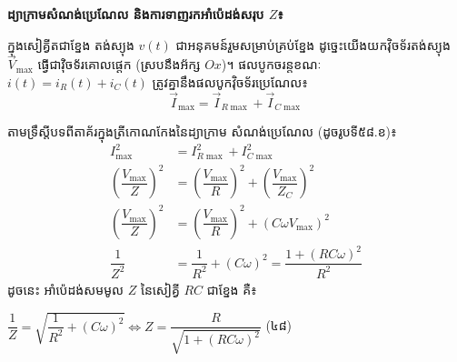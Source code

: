 \vspace{0.5em}
\noindent
\textbf{ដ្យាក្រាមសំណង់ប្រេណែល និងការទាញរកអាំប៉េដង់សរុប $Z$៖}

\noindent
ក្នុងសៀគ្វីតជាខ្នែង តង់ស្យុង $v(t)$ ជាអនុគមន៍រួមសម្រាប់គ្រប់ខ្នែង ដូច្នេះយើងយកវ៉ិចទ័រតង់ស្យុង $\vec{V}_{\max}$ ធ្វើជាវ៉ិចទ័រគោលផ្ដេក (ស្របនឹងអ័ក្ស $Ox$)។ ផលបូកចរន្តខណៈ $i(t) = i_R(t) + i_C(t)$ ត្រូវគ្នានឹងផលបូកវ៉ិចទ័រប្រេណែល៖
\[ \vec{I}_{\max} = \vec{I}_{R\max} + \vec{I}_{C\max} \]

\vspace{0.2em}
\noindent
\begin{minipage}[c]{0.56\textwidth}
	\vspace{0pt}
	\raggedright
	តាមទ្រឹស្តីបទពីតាគ័រក្នុងត្រីកោណកែងនៃដ្យាក្រាម \mbox{សំណង់ប្រេណែល} (ដូចរូបទី៥៨.ខ)៖
	\begin{align*}
		I_{\max}^2 &= I_{R\max}^2 + I_{C\max}^2 \\
		\left(\dfrac{V_{\max}}{Z}\right)^2 &= \left(\dfrac{V_{\max}}{R}\right)^2 + \left(\dfrac{V_{\max}}{Z_C}\right)^2 \\
		\left(\dfrac{V_{\max}}{Z}\right)^2 &= \left(\dfrac{V_{\max}}{R}\right)^2 + (C\omega V_{\max})^2 \\
		\dfrac{1}{Z^2} &= \dfrac{1}{R^2} + (C\omega)^2 = \dfrac{1 + (RC\omega)^2}{R^2}
	\end{align*}
	ដូចនេះ អាំប៉េដង់សមមូល $Z$ នៃសៀគ្វី $RC$ ជាខ្នែង គឺ៖
	\begin{center}
		$\boxed{\dfrac{1}{Z} = \sqrt{\dfrac{1}{R^2} + (C\omega)^2} \iff Z = \dfrac{R}{\sqrt{1 + (RC\omega)^2}}}$ \quad (៤៨)
	\end{center}
\end{minipage}%
\hfill
